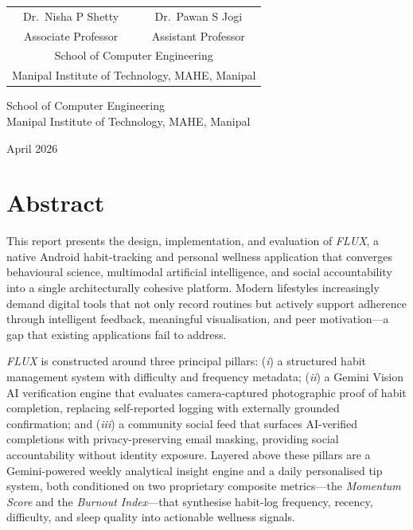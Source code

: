 \documentclass[12pt,a4paper]{article}
\newcommand{\FL}{\textit{FLUX}}
\begin{document}
\begin{titlepage}
    \begin{tabular}{cc}
        Dr.\ Nisha P Shetty & Dr.\ Pawan S Jogi \\
        Associate Professor & Assistant Professor \\
        \multicolumn{2}{c}{School of Computer Engineering} \\
        \multicolumn{2}{c}{Manipal Institute of Technology, MAHE, Manipal}
    \end{tabular}

    \vfill
    {\normalsize School of Computer Engineering\\
    Manipal Institute of Technology, MAHE, Manipal\par}
    \vspace{0.5cm}
    {\normalsize April 2026\par}
\end{titlepage}

\tableofcontents
\newpage

\section{Abstract}

This report presents the design, implementation, and evaluation of \FL{}, a native
Android habit-tracking and personal wellness application that converges behavioural
science, multimodal artificial intelligence, and social accountability into a single
architecturally cohesive platform. Modern lifestyles increasingly demand digital tools
that not only record routines but actively support adherence through intelligent feedback,
meaningful visualisation, and peer motivation---a gap that existing applications fail to
address.

\FL{} is constructed around three principal pillars: (\textit{i}) a structured habit
management system with difficulty and frequency metadata; (\textit{ii}) a Gemini Vision
AI verification engine that evaluates camera-captured photographic proof of habit
completion, replacing self-reported logging with externally grounded confirmation; and
(\textit{iii}) a community social feed that surfaces AI-verified completions with
privacy-preserving email masking, providing social accountability without identity
exposure. Layered above these pillars are a Gemini-powered weekly analytical insight
engine and a daily personalised tip system, both conditioned on two proprietary composite
metrics---the \textit{Momentum Score} and the \textit{Burnout Index}---that synthesise
habit-log frequency, recency, difficulty, and sleep quality into actionable wellness
signals.
\end{document}

